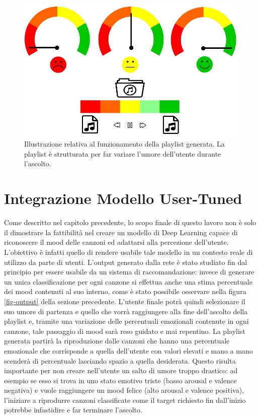 \documentclass[11pt]{report}
\begin{document}
\begin{figure}[h]
\centering
\includegraphics[scale = 1.5]{img/playlist-emotion.jpg}
\caption{Illustrazione relativa al funzionamento della playlist generata. La playlist è strutturata per far variare l'umore dell'utente durante l'ascolto.}
\label{fig:playlist-emozioni}
\end{figure}


\section{Integrazione Modello User-Tuned}

Come descritto nel capitolo precedente, lo scopo finale di questo lavoro non è solo il dimostrare la fattibilità nel creare un modello di Deep Learning capace di riconoscere il mood delle canzoni ed adattarsi alla percezione dell'utente. L'obiettivo è infatti quello di rendere usabile tale modello in un contesto reale di utilizzo da parte di utenti. L'output generato dalla rete è stato studiato fin dal principio per essere usabile da un sistema di raccomandazione: invece di generare un unica classificazione per ogni canzone si effettua anche una stima percentuale dei mood contenuti al suo interno, come è stato possibile osservare nella figura \ref{fig-output} della sezione precedente. L'utente finale potrà quindi selezionare il suo umore di partenza e quello che vorrà raggiungere alla fine dell'ascolto della playlist e, tramite una variazione delle percentuali emozionali contenute in ogni canzone, tale passaggio di mood sarà reso guidato e mai repentino. La playlist generata partirà la riproduzione dalle canzoni che hanno una percentuale emozionale che corrisponde a quella dell'utente con valori elevati e mano a mano scenderà di percentuale lasciando spazio a quella desiderata. Questo risulta importante per non creare nell'utente un salto di umore troppo drastico: ad esempio se esso si trova in uno stato emotivo triste (basso arousal e valence negativa) e vuole raggiungere un mood felice (alto arousal e valence positiva), l'iniziare a riprodurre canzoni classificate come il target richiesto fin dall'inizio potrebbe infastidire e far terminare l'ascolto.
\end{document}
